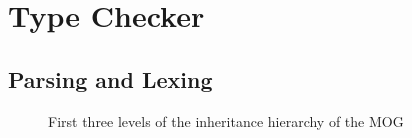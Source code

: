\newcommand{\tbontype}{\textsc{tbon}\textunderscore \textsc{tc}\textunderscore  \textsc{type}}
\newcommand{\tbonclasstype}{\textsc{tbon}\textunderscore \textsc{tc}\textunderscore \textsc{class}\textunderscore  \textsc{type}}
\newcommand{\tbonclustertype}{\textsc{tbon}\textunderscore \textsc{tc}\textunderscore \textsc{cluster}\textunderscore  \textsc{type}}
\newcommand{\tbonfeature}{\textsc{tbon}\textunderscore \textsc{tc}\textunderscore \textsc{feature}}
\newcommand{\tbongeneric}{\textsc{tbon}\textunderscore \textsc{tc}\textunderscore \textsc{generic}}

\section{Type Checker}
\label{implementation-def-boolean-type}
\label{implementation-set-expressions}
\subsection{Parsing and Lexing}
\begin{figure}[H]
    \centerline{}
    \caption[MOG hierarchy]{First three levels of the inheritance hierarchy of the MOG}
    \label{fig:mog-hierarchy}
\end{figure}


